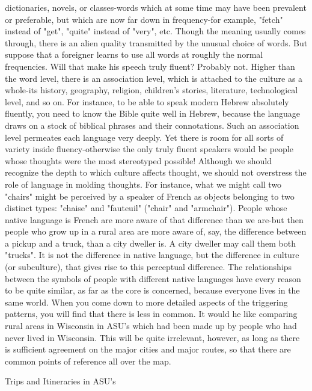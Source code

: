 dictionaries, novels, or classes-words which at some time may have been prevalent or
preferable, but which are now far down in frequency-for example, "fetch" instead of
"get", "quite" instead of "very", etc. Though the meaning usually comes through, there is
an alien quality transmitted by the unusual choice of words.
         But suppose that a foreigner learns to use all words at roughly the normal
frequencies. Will that make his speech truly fluent? Probably not. Higher than the word
level, there is an association level, which is attached to the culture as a whole-its history,
geography, religion, children's stories, literature, technological level, and so on. For
instance, to be able to speak modern Hebrew absolutely fluently, you need to know the
Bible quite well in Hebrew, because the language draws on a stock of biblical phrases
and their connotations. Such an association level permeates each language very deeply.
Yet there is room for all sorts of variety inside fluency-otherwise the only truly fluent
speakers would be people whose thoughts were the most stereotyped possible!
         Although we should recognize the depth to which culture affects thought, we
should not overstress the role of language in molding thoughts. For instance, what we
might call two "chairs" might be perceived by a speaker of French as objects belonging to
two distinct types: "chaise" and "fauteuil" ("chair" and "armchair"). People whose native
language is French are more aware of that difference than we are-but then people who
grow up in a rural area are more aware of, say, the difference between a pickup and a
truck, than a city dweller is. A city dweller may call them both "trucks". It is not the
difference in native language, but the difference in culture (or subculture), that gives rise
to this perceptual difference.
         The relationships between the symbols of people with different native languages
have every reason to be quite similar, as far as the core is concerned, because everyone
lives in the same world. When you come down to more detailed aspects of the triggering
patterns, you will find that there is less in common. It would he like comparing rural
areas in Wisconsin in ASU's which had been made up by people who had never lived in
Wisconsin. This will be quite irrelevant, however, as long as there is sufficient agreement
on the major cities and major routes, so that there are common points of reference all
over the map.


                              Trips and Itineraries in ASU's

